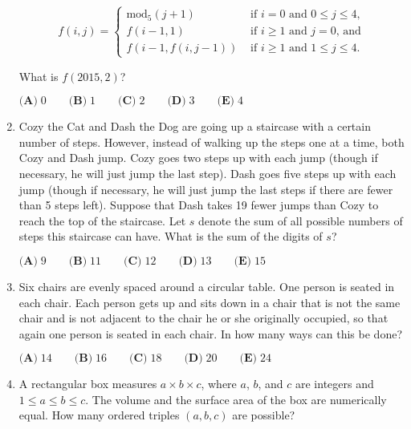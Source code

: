 \documentclass{article}
\begin{document}
\begin{enumerate}[label=\arabic*., itemsep=0.5em]
\begin{equation*}
f(i,j) = \begin{cases}\text{mod}_5 (j+1) & \text{ if } i = 0 \text{ and } 0 \le j \le 4 \text{,}\\
f(i-1,1) & \text{ if } i \ge 1 \text{ and } j = 0 \text{, and} \\
f(i-1, f(i,j-1)) & \text{ if } i \ge 1 \text{ and } 1 \le j \le 4.
\end{cases}
\end{equation*}
  

What is \(f(2015,2)\)?

\(\textbf{(A)}\; 0 \qquad\textbf{(B)}\; 1 \qquad\textbf{(C)}\; 2 \qquad\textbf{(D)}\; 3 \qquad\textbf{(E)}\; 4\)\par \vspace{0.5em}\item Cozy the Cat and Dash the Dog are going up a staircase with a certain number of steps. However, instead of walking up the steps one at a time, both Cozy and Dash jump. Cozy goes two steps up with each jump (though if necessary, he will just jump the last step). Dash goes five steps up with each jump (though if necessary, he will just jump the last steps if there are fewer than 5 steps left). Suppose that Dash takes 19 fewer jumps than Cozy to reach the top of the staircase. Let \(s\) denote the sum of all possible numbers of steps this staircase can have. What is the sum of the digits of \(s\)?

\(\textbf{(A)}\; 9 \qquad\textbf{(B)}\; 11 \qquad\textbf{(C)}\; 12 \qquad\textbf{(D)}\; 13 \qquad\textbf{(E)}\; 15\)\par \vspace{0.5em}\item Six chairs are evenly spaced around a circular table. One person is seated in each chair. Each person gets up and sits down in a chair that is not the same chair and is not adjacent to the chair he or she originally occupied, so that again one person is seated in each chair. In how many ways can this be done?

\(\textbf{(A)}\; 14 \qquad\textbf{(B)}\; 16 \qquad\textbf{(C)}\; 18 \qquad\textbf{(D)}\; 20 \qquad\textbf{(E)}\; 24\)\par \vspace{0.5em}\item A rectangular box measures \(a \times b \times c\), where \(a\), \(b\), and \(c\) are integers and \(1\leq a \leq b \leq c\). The volume and the surface area of the box are numerically equal. How many ordered triples \((a,b,c)\) are possible?


\end{enumerate}
\end{document}

